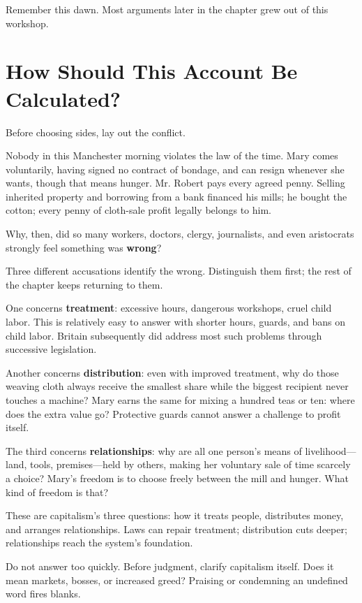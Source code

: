 Remember this dawn. Most arguments later in the chapter grew out of this workshop.

\section{How Should This Account Be Calculated?}
Before choosing sides, lay out the conflict.

Nobody in this Manchester morning violates the law of the time. Mary comes voluntarily, having signed no contract of bondage, and can resign whenever she wants, though that means hunger. Mr. Robert pays every agreed penny. Selling inherited property and borrowing from a bank financed his mills; he bought the cotton; every penny of cloth-sale profit legally belongs to him.

Why, then, did so many workers, doctors, clergy, journalists, and even aristocrats strongly feel something was \textbf{wrong}?

Three different accusations identify the wrong. Distinguish them first; the rest of the chapter keeps returning to them.

One concerns \textbf{treatment}: excessive hours, dangerous workshops, cruel child labor. This is relatively easy to answer with shorter hours, guards, and bans on child labor. Britain subsequently did address most such problems through successive legislation.

Another concerns \textbf{distribution}: even with improved treatment, why do those weaving cloth always receive the smallest share while the biggest recipient never touches a machine? Mary earns the same for mixing a hundred teas or ten: where does the extra value go? Protective guards cannot answer a challenge to profit itself.

The third concerns \textbf{relationships}: why are all one person's means of livelihood---land, tools, premises---held by others, making her voluntary sale of time scarcely a choice? Mary's freedom is to choose freely between the mill and hunger. What kind of freedom is that?

These are capitalism's three questions: how it treats people, distributes money, and arranges relationships. Laws can repair treatment; distribution cuts deeper; relationships reach the system's foundation.

Do not answer too quickly. Before judgment, clarify capitalism itself. Does it mean markets, bosses, or increased greed? Praising or condemning an undefined word fires blanks.

